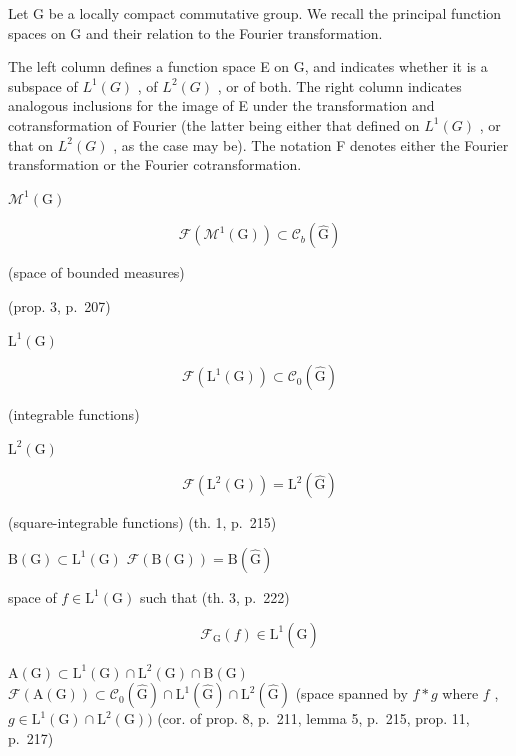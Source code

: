 
Let G be a locally compact commutative group. We recall the principal function spaces on G and their relation to the Fourier transformation.

The left column defines a function space E on G, and indicates whether it is a subspace of \(L^{1}(G)\) , of \(L^{2}(G)\) , or of both. The right column indicates analogous inclusions for the image of E under the transformation and cotransformation of Fourier (the latter being either that defined on \(L^{1}(G)\) , or that on \(L^{2}(G)\) , as the case may be). The notation F denotes either the Fourier transformation or the Fourier cotransformation.

\(\mathcal{M}^1 (\mathrm{G})\)

\[
\mathcal {F} (\mathcal {M} ^ {1} (\mathrm{G})) \subset \mathcal {C} _ {b} (\widehat {\mathrm{G}})
\]

(space of bounded measures)

(prop. 3, p.~207)

\(\mathrm{L}^{1}(\mathrm{G})\)

\[
\mathcal {F} (\mathrm{L} ^ {1} (\mathrm{G})) \subset \mathcal {C} _ {0} (\widehat {\mathrm{G}})
\]

(integrable functions)

\(\mathrm{L}^2 (\mathrm{G})\)

\[
\mathscr {F} (\mathrm{L} ^ {2} (\mathrm{G})) = \mathrm{L} ^ {2} (\widehat {\mathrm{G}})
\]

(square-integrable functions) (th. 1, p.~215)

\(\mathrm{B(G)}\subset \mathrm{L}^{1}(\mathrm{G})\) \(\mathcal{F}(\mathrm{B(G)}) = \mathrm{B}(\widehat{\mathrm{G}})\)

space of \(f \in \mathrm{L}^1(\mathrm{G})\) such that (th. 3, p.~222)

\[
\mathcal {F} _ {\mathrm{G}} (f) \in \mathrm{L} ^ {1} (\widehat {\mathrm{G}})
\]

\(\mathrm{A(G)}\subset \mathrm{L}^1 (\mathrm{G})\cap \mathrm{L}^2 (\mathrm{G})\cap \mathrm{B(G)}\) \(\mathcal{F}(\mathrm{A(G)})\subset \mathcal{C}_0(\widehat{\mathrm{G}})\cap \mathrm{L}^1 (\widehat{\mathrm{G}})\cap \mathrm{L}^2 (\widehat{\mathrm{G}})\) (space spanned by \(f*g\) where \(f\) , \(g\in \mathrm{L}^{1}(\mathrm{G})\cap \mathrm{L}^{2}(\mathrm{G}))\) (cor. of prop. 8, p.~211, lemma 5, p.~215, prop. 11, p.~217)

